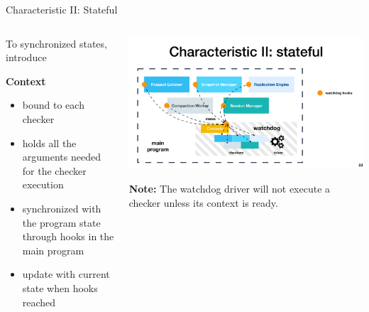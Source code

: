 \documentclass[aspectratio=169]{beamer}
\begin{document}
\begin{frame}{Characteristic II: Stateful}
    \begin{columns}

        \begin{column}{.5\textwidth}
            To synchronized states, introduce
            \begin{block}{\textbf{Context}}
                \begin{itemize}
                    \item bound
                          to each checker
                    \item  holds all the arguments needed for the
                          checker execution
                    \item  synchronized with the program state through hooks in the main program
                    \item update with current state when hooks reached
                \end{itemize}
            \end{block}
        \end{column}

        \begin{column}{.5\textwidth}

            \begin{center}
                \includegraphics[width=\textwidth]{fig/staetful}
            \end{center}

            \textbf{Note:} The watchdog driver will not execute a checker unless its context is ready.

        \end{column}
    \end{columns}

\end{frame}
\end{document}
